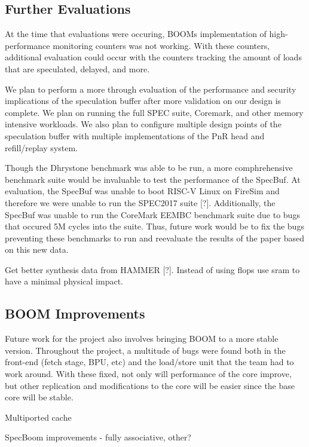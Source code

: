 \subsection{Further Evaluations}

At the time that evaluations were occuring, BOOMs implementation of high-performance monitoring counters was not working.
With these counters, additional evaluation could occur with the counters tracking the amount of 
loads that are speculated, delayed, and more.

We plan to perform a more through evaluation of the performance and security implications of the
speculation buffer after more validation on our design is complete. We plan on running the full
SPEC suite, Coremark, and other memory intensive workloads. We also plan to configure multiple design
points of the speculation buffer with multiple implementations of the PnR head and refill/replay system.

Though the Dhrystone benchmark was able to be run, a more comphrehensive benchmark suite would be invaluable to test
the performance of the SpecBuf. At evaluation, the SpecBuf was unable to boot RISC-V Linux on FireSim and therefore
we were unable to run the SPEC2017 suite [?]. Additionally, the SpecBuf was unable to run the CoreMark EEMBC benchmark
suite due to bugs that occured 5M cycles into the suite. Thus, future work would be to fix the bugs preventing these
benchmarks to run and reevaluate the results of the paper based on this new data.

Get better synthesis data from HAMMER [?]. Instead of using flops use sram to have a minimal 
physical impact.

\subsection{BOOM Improvements}

Future work for the project also involves bringing BOOM to a more stable version. Throughout
the project, a multitude of bugs were found both in the front-end (fetch stage, BPU, etc) and the 
load/store unit that the team had to work around. With these fixed, not only will performance
of the core improve, but other replication and modifications to the core will be easier since
the base core will be stable.

Multiported cache

SpecBoom improvements - fully associative, other?

